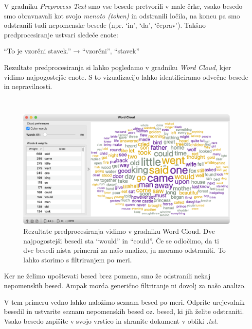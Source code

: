 V gradniku \textit{Preprocess Text} smo vse besede pretvorili v male črke, vsako besedo smo obravnavali kot svojo \textit{menoto (token)} in odstranili ločila, na koncu pa smo odstranili tudi nepomenske besede (npr. ‘in’, ‘da’, ‘čeprav’). Takšno predprocesiranje ustvari sledeče enote:

\vspace{0.3cm}
\noindent ``To je vzorčni stavek.'' → ``vzorčni'', ``stavek''
\vspace{0.3cm}

Rezultate predprocesiranja si lahko pogledamo v gradniku \textit{Word Cloud}, kjer vidimo najpogostejše enote. S to vizualizacijo lahko identificiramo odvečne besede in nepravilnosti.

 \newpage

\begin{figure}[h]
  \centering
  \includegraphics[width=\linewidth]{word-cloud.png}%
  \caption{Rezultate predprocesiranja vidimo v gradniku Word Cloud. Dve najpogostejši besedi sta “would” in “could”. Če se odločimo, da ti dve besedi nista primerni za našo analizo, ju moramo odstraniti. To lahko storimo s filtriranjem po meri.}
  \label{fig:002-word-cloud}
\end{figure}

Ker ne želimo upoštevati besed brez pomena, smo že odstranili nekaj nepomenskih besed. Ampak morda generično filtriranje ni dovolj za našo analizo.

V tem primeru vedno lahko naložimo seznam besed po meri. Odprite urejevalnik besedil in ustvarite seznam nepomenskih besed oz. besed, ki jih želite odstraniti. Vsako besedo zapišite v svojo vrstico in shranite dokument v obliki \textit{.txt}.

